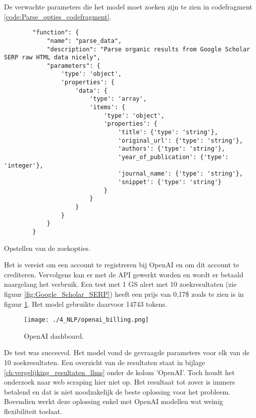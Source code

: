De verwachte parameters die het model moet zoeken zijn te zien in codefragment \ref{code:Parse_opties_codefragment}.\\
\begin{listing}[h!]
    \begin{verbatim}
        "function": {
            "name": "parse_data",
            "description": "Parse organic results from Google Scholar SERP raw HTML data nicely",
            "parameters": {
                'type': 'object',
                'properties': {
                    'data': {
                        'type': 'array',
                        'items': {
                            'type': 'object',
                            'properties': {
                                'title': {'type': 'string'},
                                'original_url': {'type': 'string'},
                                'authors': {'type': 'string'},
                                'year_of_publication': {'type': 'integer'},
                                'journal_name': {'type': 'string'},
                                'snippet': {'type': 'string'}
                            }
                        }
                    }
                }
            }
        }
    \end{verbatim}
    \caption[OpenAI parameters]{Opstellen van de zoekopties.}
    \label{code:Parse_opties_codefragment}
\end{listing}
Het is vereist om een account te registreren bij OpenAI en om dit account te crediteren. Vervolgens kan er met de API gewerkt worden en wordt er betaald naargelang het verbruik.
Een test met 1 GS alert met 10 zoekresultaten (zie figuur \ref{fig:Google_Scholar_SERP}) heeft een prijs van 0,17\$ zoals te zien is in figuur \ref{fig:OpenAI_dashboard}. Het model gebruikte daarvoor 14743 tokens. 
\begin{figure}[h!]
    \centering
    \texttt{[image: ./4\_NLP/openai\_billing.png]}
    \caption[OpenAI dashboard.]{\label{fig:OpenAI_dashboard}OpenAI dashboard.}
\end{figure}
De test was succesvol. Het model vond de gevraagde parameters voor elk van de 10 zoekresultaten. Een overzicht van de resultaten staat in bijlage \ref{ch:vergelijking_resultaten_llms} onder de kolom 'OpenAI'. Toch houdt het onderzoek naar web scraping hier niet op. Het resultaat tot zover is immers betalend en dat is niet noodzakelijk de beste oplossing voor het probleem. Bovendien werkt deze oplossing enkel met OpenAI modellen wat weinig flexibiliteit toelaat.

